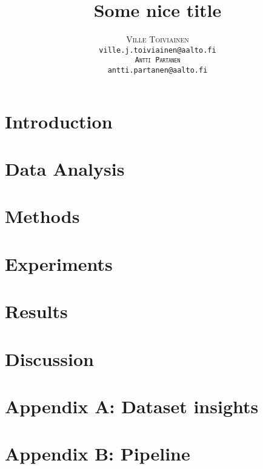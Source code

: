 \documentclass[twoside]{article}
\title{\vspace{-15mm}\fontsize{24pt}{10pt}\selectfont\textbf{Some nice title}}
\date{}
\author{
  \large
  \textsc{Ville Toiviainen}\\[2mm]
  \tt ville.j.toiviainen@aalto.fi \\[2mm]
  \textsc{Antti Partanen}\\[2mm]
  \tt antti.partanen@aalto.fi \\[2mm]
}
\begin{document}
\maketitle %


\begin{abstract}
  
\end{abstract}


\begin{multicols}{2} %

  \section{Introduction}
  \label{sec:introduction}
  

  \section{Data Analysis}
  \label{sec:methods}
  

  \section{Methods}
  \label{sec:methods}
  

  \section{Experiments}
  \label{sec:experiments}
  

  \section{Results}
  \label{sec:results}
  

  \section{Discussion}
  \label{sec:discussion}
  



  
  

\end{multicols} %
\pagebreak
\section{Appendix A: Dataset insights}
\label{appendix-a}


\section{Appendix B: Pipeline}
\label{appendix-b}


\end{document}
